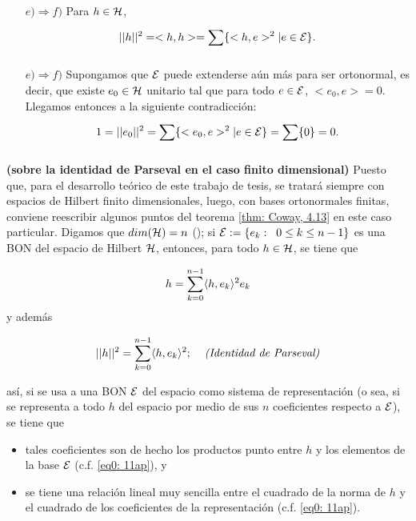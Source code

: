 \begin{itemize}
\item[$e) \Rightarrow f)$] Para $h \in \mathcal{H}$,
\[
||h||^{2}=<h,h> = \sum\limits_{}^{}\{ <h,e>^{2}| e \in \mathcal{E} \}.
\]

\item[$e) \Rightarrow f)$]
Supongamos que $\mathcal{E}$ puede extenderse aún más
para ser ortonormal, es decir, que existe 
$e_{0} \in \mathcal{H}$ unitario tal que
para todo $e \in \mathcal{E}$, $<e_{0}, e>=0$. 
Llegamos entonces a la siguiente contradicción:
\[
1=||e_{0}||^{2}=\sum\limits_{}^{}\{ <e_{0}, e>^{2}| e \in \mathcal{E} \}=
\sum\limits_{}^{}\{ 0\}=0.
\]
\QEDB
\end{itemize}
\vspace{0.2cm}


\begin{nota}
\textbf{(sobre la identidad de Parseval en el
caso finito dimensional)}
Puesto que, para el desarrollo teórico de este trabajo de tesis,
se tratará siempre con espacios de Hilbert finito dimensionales, luego, con
bases ortonormales finitas, conviene
reescribir algunos puntos del teorema 
\ref{thm: Coway, 4.13} en este caso particular.
Digamos que $dim(\mathcal{H})=n$ (); si 
$\mathcal{E} := \{e_{k}: \hspace{0.2cm} 0 \leq k \leq n-1 \}$ es una
BON del espacio de Hilbert $\mathcal{H}$, entonces, para todo
$h \in \mathcal{H}$, se tiene que 

\begin{equation}
\label{eq0: 11ap}
h = \sum\limits_{k=0}^{n-1}\langle h , e_{k} \rangle^{2} e_{k}
\end{equation}
y además

\begin{equation}
\label{eq1: 11ap}
|| h ||^{2} = \sum\limits_{k=0}^{n-1}\langle h , e_{k} \rangle^{2};
\hspace{0.4cm} \textit{(Identidad de Parseval)}
\end{equation}


\noindent
así, si se usa a una BON $\mathcal{E}$ del espacio como sistema
de representación (o sea, si se representa a todo $h$ del espacio 
por medio de sus $n$ coeficientes respecto a $\mathcal{E}$), se tiene que
\begin{itemize}
	\item tales coeficientes son de hecho los productos punto entre
	$h$ y los elementos de la base $\mathcal{E}$ (c.f. 
	\eqref{eq0: 11ap}), y
	\item se tiene una relación lineal muy sencilla entre el cuadrado
	de la norma de $h$ y el cuadrado de los coeficientes de la representación
	(c.f. \eqref{eq0: 11ap}).
\end{itemize}


\end{nota}
